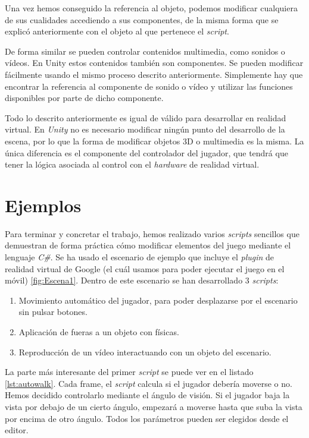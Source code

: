 \documentclass{pre-tfg}
\begin{document}
Una vez hemos conseguido la referencia al objeto, podemos modificar cualquiera de sus cualidades accediendo a sus componentes, de la misma forma que se explicó anteriormente con el objeto al que pertenece el \textit{script}. 

De forma similar se pueden controlar contenidos multimedia, como sonidos o vídeos. En Unity estos contenidos también son componentes. Se pueden modificar fácilmente usando el mismo proceso descrito anteriormente. Simplemente hay que encontrar la referencia al componente de sonido o vídeo y utilizar las funciones disponibles por parte de dicho componente.

Todo lo descrito anteriormente es igual de válido para desarrollar en realidad virtual. En \textit{Unity} no es necesario modificar ningún punto del desarrollo de la escena, por lo que la forma de modificar objetos 3D o multimedia es la misma. La única diferencia es el componente del controlador del jugador, que tendrá que tener la lógica asociada al control con el \textit{hardware} de realidad virtual.

\section{Ejemplos}

Para terminar y concretar el trabajo, hemos realizado varios \textit{scripts} sencillos que demuestran de forma práctica cómo modificar elementos del juego mediante el lenguaje \textit{C\#}. Se ha usado el escenario de ejemplo que incluye el \textit{plugin} de realidad virtual de Google (el cuál usamos para poder ejecutar el juego en el móvil) \ref{fig:Escena1}. Dentro de este escenario se han desarrollado 3 \textit{scripts}:

\begin{enumerate}
\item Movimiento automático del jugador, para poder desplazarse por el escenario sin pulsar botones.
\item Aplicación de fueras a un objeto con físicas.
\item Reproducción de un vídeo interactuando con un objeto del escenario.
\end{enumerate}

La parte más interesante del primer \textit{script} se puede ver en el listado \ref{lst:autowalk}. Cada frame, el \textit{script} calcula si el jugador debería moverse o no. Hemos decidido controlarlo mediante el ángulo de visión. Si el jugador baja la vista por debajo de un cierto ángulo, empezará a moverse hasta que suba la vista por encima de otro ángulo. Todos los parámetros pueden ser elegidos desde el editor.
\end{document}
